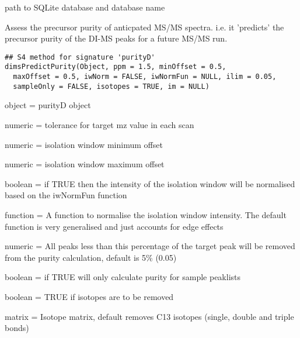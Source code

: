 \documentclass[letterpaper]{book}
\begin{document}
%
\begin{Value}
path to SQLite database and database name
\end{Value}
%
\begin{Description}\relax
Assess the precursor purity of anticpated MS/MS spectra.
i.e. it 'predicts' the precursor purity of the DI-MS peaks for a future MS/MS run.
\end{Description}
%
\begin{Usage}
\begin{verbatim}
## S4 method for signature 'purityD'
dimsPredictPurity(Object, ppm = 1.5, minOffset = 0.5,
  maxOffset = 0.5, iwNorm = FALSE, iwNormFun = NULL, ilim = 0.05,
  sampleOnly = FALSE, isotopes = TRUE, im = NULL)
\end{verbatim}
\end{Usage}
%
\begin{Arguments}
\begin{ldescription}
\item[\code{Object}] object = purityD object

\item[\code{ppm}] numeric = tolerance for target mz value in each scan

\item[\code{minOffset}] numeric = isolation window minimum offset

\item[\code{maxOffset}] numeric = isolation window maximum offset

\item[\code{iwNorm}] boolean = if TRUE then the intensity of the isolation window will be normalised based on the iwNormFun function

\item[\code{iwNormFun}] function = A function to normalise the isolation window intensity. The default function is very generalised and just accounts for edge effects

\item[\code{ilim}] numeric = All peaks less than this percentage of the target peak will be removed from the purity calculation, default is 5\% (0.05)

\item[\code{sampleOnly}] boolean = if TRUE will only calculate purity for sample peaklists

\item[\code{isotopes}] boolean = TRUE if isotopes are to be removed

\item[\code{im}] matrix = Isotope matrix, default removes C13 isotopes (single, double and triple bonds)
\end{ldescription}
\end{Arguments}
\end{document}
